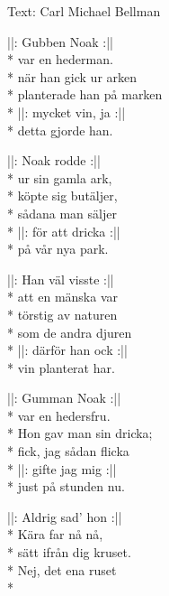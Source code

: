 \begin{SongText}
    \begin{SongInfo}
        Text: Carl Michael Bellman
    \end{SongInfo}
    \begin{SongVerse}
        ||: Gubben Noak :||\\*%
        var en hederman.\\*%
        när han gick ur arken\\*%
        planterade han på marken\\*%
        ||: mycket vin, ja :||\\*%
        detta gjorde han.
    \end{SongVerse}
    \begin{SongVerse}
        ||: Noak rodde :||\\*%
        ur sin gamla ark,\\*%
        köpte sig butäljer,\\*%
        sådana man säljer\\*%
        ||: för att dricka :||\\*%
        på vår nya park.
    \end{SongVerse}
    \begin{SongVerse}
        ||: Han väl visste :||\\*%
        att en mänska var\\*%
        törstig av naturen\\*%
        som de andra djuren\\*%
        ||: därför han ock :||\\*%
        vin planterat har.
    \end{SongVerse}
    \begin{SongVerse}
        ||: Gumman Noak :||\\*%
        var en hedersfru.\\*%
        Hon gav man sin dricka;\\*%
        fick, jag sådan flicka\\*%
        ||: gifte jag mig :||\\*%
        just på stunden nu.
    \end{SongVerse}
    \begin{SongVerse}
        ||: Aldrig sad’ hon :||\\*%
        Kära far nå nå,\\*%
        sätt ifrån dig kruset.\\*%
        Nej, det ena ruset\\*%

\end{SongVerse}
\end{SongText}
